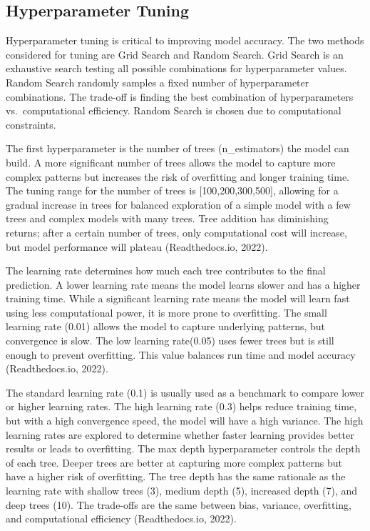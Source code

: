 \documentclass[mstat,12pt]{unswthesis}
\begin{document}
\subsection{Hyperparameter Tuning}\label{hyperparameter-tuning}

Hyperparameter tuning is critical to improving model accuracy. The two
methods considered for tuning are Grid Search and Random Search. Grid
Search is an exhaustive search testing all possible combinations for
hyperparameter values. Random Search randomly samples a fixed number of
hyperparameter combinations. The trade-off is finding the best
combination of hyperparameters vs.~computational efficiency. Random
Search is chosen due to computational constraints.

The first hyperparameter is the number of trees (n\_estimators) the
model can build. A more significant number of trees allows the model to
capture more complex patterns but increases the risk of overfitting and
longer training time. The tuning range for the number of trees is
{[}100,200,300,500{]}, allowing for a gradual increase in trees for
balanced exploration of a simple model with a few trees and complex
models with many trees. Tree addition has diminishing returns; after a
certain number of trees, only computational cost will increase, but
model performance will plateau (Readthedocs.io, 2022).

The learning rate determines how much each tree contributes to the final
prediction. A lower learning rate means the model learns slower and has
a higher training time. While a significant learning rate means the
model will learn fast using less computational power, it is more prone
to overfitting. The small learning rate (0.01) allows the model to
capture underlying patterns, but convergence is slow. The low learning
rate(0.05) uses fewer trees but is still enough to prevent overfitting.
This value balances run time and model accuracy (Readthedocs.io, 2022).

The standard learning rate (0.1) is usually used as a benchmark to
compare lower or higher learning rates. The high learning rate (0.3)
helps reduce training time, but with a high convergence speed, the model
will have a high variance. The high learning rates are explored to
determine whether faster learning provides better results or leads to
overfitting. The max depth hyperparameter controls the depth of each
tree. Deeper trees are better at capturing more complex patterns but
have a higher risk of overfitting. The tree depth has the same rationale
as the learning rate with shallow trees (3), medium depth (5), increased
depth (7), and deep trees (10). The trade-offs are the same between
bias, variance, overfitting, and computational efficiency
(Readthedocs.io, 2022).
\end{document}
